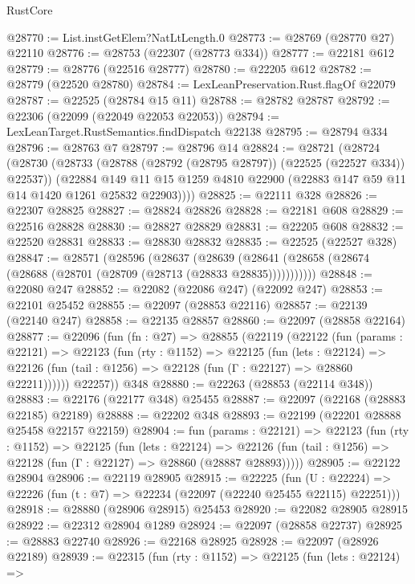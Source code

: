 \begin{lexlean}{RustCore}
\begin{coremodule}
@28770 := List.instGetElem?NatLtLength.{0}
@28773 := @28769 (@28770 @27) @22110
@28776 := @28753 (@22307 (@28773 @334))
@28777 := @22181 @612
@28779 := @28776 (@22516 @28777)
@28780 := @22205 @612
@28782 := @28779 (@22520 @28780)
@28784 := LexLeanPreservation.Rust.flagOf @22079
@28787 := @22525 (@28784 @15 @11)
@28788 := @28782 @28787
@28792 := @22306 (@22099 (@22049 @22053 @22053))
@28794 := LexLeanTarget.RustSemantics.findDispatch @22138
@28795 := @28794 @334
@28796 := @28763 @7
@28797 := @28796 @14
@28824 := @28721
    (@28724
      (@28730
        (@28733 (@28788 (@28792 (@28795 @28797)) (@22525 (@22527 @334)) @22537))
        (@22884
          @149
          @11
          @15
          @1259
          @4810
          @22900
          (@22883 @147 @59 @11 @14 @1420 @1261 @25832 @22903))))
@28825 := @22111 @328
@28826 := @22307 @28825
@28827 := @28824 @28826
@28828 := @22181 @608
@28829 := @22516 @28828
@28830 := @28827 @28829
@28831 := @22205 @608
@28832 := @22520 @28831
@28833 := @28830 @28832
@28835 := @22525 (@22527 @328)
@28847 := @28571
    (@28596
      (@28637
        (@28639 (@28641 (@28658 (@28674 (@28688 (@28701 (@28709 (@28713 (@28833 @28835)))))))))))
@28848 := @22080 @247
@28852 := @22082 (@22086 @247) (@22092 @247)
@28853 := @22101 @25452
@28855 := @22097 (@28853 @22116)
@28857 := @22139 (@22140 @247)
@28858 := @22135 @28857
@28860 := @22097 (@28858 @22164)
@28877 := @22096
    (fun (fn : @27) =>
    @28855
      (@22119
        (@22122
          (fun (params : @22121) =>
          @22123
            (fun (rty : @1152) =>
            @22125
              (fun (lets : @22124) =>
              @22126 (fun (tail : @1256) => @22128 (fun (Γ : @22127) => @28860 @22211))))))
        @22257))
    @348
@28880 := @22263 (@28853 (@22114 @348))
@28883 := @22176 (@22177 @348) @25455
@28887 := @22097 (@22168 (@28883 @22185) @22189)
@28888 := @22202 @348
@28893 := @22199 (@22201 @28888 @25458 @22157 @22159)
@28904 := fun (params : @22121) =>
  @22123
    (fun (rty : @1152) =>
    @22125
      (fun (lets : @22124) =>
      @22126 (fun (tail : @1256) => @22128 (fun (Γ : @22127) => @28860 (@28887 @28893)))))
@28905 := @22122 @28904
@28906 := @22119 @28905
@28915 := @22225
    (fun (U : @22224) => @22226 (fun (t : @7) => @22234 (@22097 (@22240 @25455 @22115) @22251)))
@28918 := @28880 (@28906 @28915) @25453
@28920 := @22082 @28905 @28915
@28922 := @22312 @28904 @1289
@28924 := @22097 (@28858 @22737)
@28925 := @28883 @22740
@28926 := @22168 @28925
@28928 := @22097 (@28926 @22189)
@28939 := @22315
    (fun (rty : @1152) =>
    @22125
      (fun (lets : @22124) =>

\end{coremodule}
\end{lexlean}
